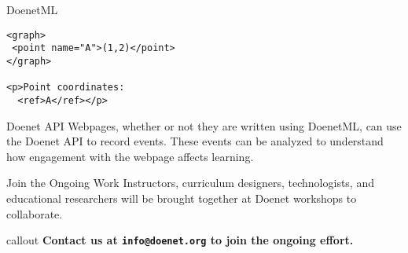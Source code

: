 \vspace{-2ex}
\vspace{1ex}

\begin{sectionblock}{DoenetML}
\begin{verbatim}
<graph>
 <point name="A">(1,2)</point>
</graph>

<p>Point coordinates:
  <ref>A</ref></p> 
\end{verbatim}
\end{sectionblock}

\vspace{1ex}

\begin{sectionblock}{Doenet API}
  Webpages, whether or not they are written using DoenetML, can use
  the Doenet API to record events.  These events can be analyzed to
  understand how engagement with the webpage affects learning.
  
\end{sectionblock}

\vspace{1ex}

\begin{sectionblock}{Join the Ongoing Work}
  Instructors, curriculum designers, technologists, and educational
  researchers will be brought together at Doenet workshops to
  collaborate.

  \vspace{1ex}
  \begin{beamercolorbox}[sep=0.5em]{callout}
    \vspace{1ex}\textbf{Contact us at \texttt{info@doenet.org} to join the
      ongoing effort.}
  \end{beamercolorbox}
\end{sectionblock}


